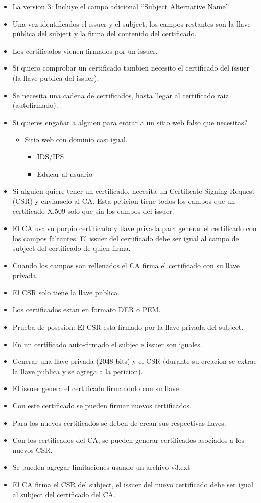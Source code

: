 \documentclass[11pt]{article}
\begin{document}
\begin{itemize}
\item La version 3: Incluye el campo adicional ``Subject Alternative Name''
\item Una vez identificados el issuer y el subject, los campos restantes son la llave pública del subject y la firma del contenido del certificado.
\item Los certificados vienen firmados por un issuer.
\item Si quiero comprobar un certificado tambien necesito el certificado del issuer (la llave publica del issuer).
\item Se necesita una cadena de certificados, hasta llegar al certificado raiz (autofirmado).
\item Si quieres engañar a alguien para entrar a un sitio web falso que necesitas?
\begin{itemize}
\item Sitio web con dominio casi igual.
\begin{itemize}
\item IDS/IPS
\item Educar al usuario
\end{itemize}
\end{itemize}

\item Si alguien quiere tener un certificado, necesita un Certificate Signing Request (CSR) y enviarselo al CA. Esta peticion tiene todos los campos que un certificado X.509 solo que sin los campos del issuer.
\item El CA usa su porpio certificado y llave privada para generar el certificado con los campos faltantes. El issuer del certificado debe ser igual al campo de subject del certificado de quien firma.
\item Cuando los campos son rellenados el CA firma el certificado con su llave privada.
\item El CSR solo tiene la llave publica.
\item Los certificados estan en formato DER o PEM.
\item Prueba de posesion: El CSR esta firmado por la llave privada del subject.
\item En un certificado auto-firmado el subjec e issuer son iguales.

\item Generar una llave privada (2048 bits) y el CSR (durante su creacion se extrae la llave publica y se agrega a la peticion).
\item El issuer genera el certificado firmandolo con su llave
\item Con este certificado se pueden firmar nuevos certificados.
\item Para los nuevos certificados se deben de crean sus respectivas llaves.
\item Con los certificados del CA, se pueden generar certificados asociados a los nuevos CSR.
\item Se pueden agregar limitaciones usando un archivo v3.ext
\item El CA firma el CSR del subject, el issuer del nuevo certificado debe ser igual al subject del certificado del CA.
\end{itemize}
\end{document}
